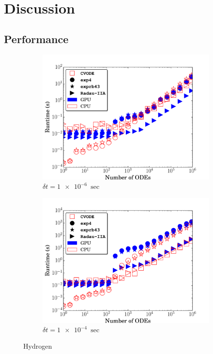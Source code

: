 \documentclass[preprint,12pt]{elsarticle}
\begin{document}
\section{Discussion}
\subsection{Performance}
\begin{figure}
  \centering
  \begin{subfigure}{0.48\textwidth}
      \includegraphics[width=\linewidth]{H2_1e-06_cpuvsgpu.pdf}
      \caption{$\delta t = \SI{1e-6}{\sec}$}
  \end{subfigure}
  \hfill
  \begin{subfigure}{0.48\textwidth}
      \includegraphics[width=\linewidth]{H2_1e-04_cpuvsgpu.pdf}
      \caption{$\delta t = \SI{1e-4}{\sec}$}
  \end{subfigure}
  \caption{Hydrogen}
  \label{F:H2_perf}
\end{figure}
\end{document}
